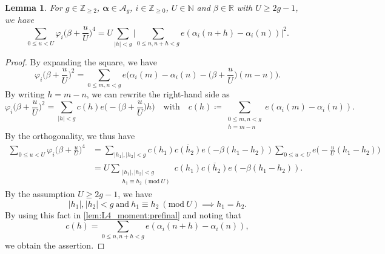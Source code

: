 \documentclass[hidelinks]{amsart}
\numberwithin{equation}{section}
\theoremstyle{plain}
\newtheorem{lemma}{Lemma}
\theoremstyle{definition}
\let\tmp\phi
\let\phi\varphi
\let\varphi\tmp
\let\tmp\epsilon
\let\epsilon\varepsilon
\let\varepsilon\tmp
\renewcommand{\mod}[1]{(\mathrm{mod}\ #1)}
\begin{document}
\begin{lemma}
\label{lem:L4_moment}
For $g\in\mathbb{Z}_{\ge2}$, $\bm{\alpha}\in\mathscr{A}_{g}$,
$i\in\mathbb{Z}_{\ge0}$, $U\in\mathbb{N}$ and $\beta\in\mathbb{R}$ with $U\ge 2g-1$, we have
\[
\sum_{0\le u<U}
\phi_{i}\biggl(\beta+\frac{u}{U}\biggr)^{4}
=
U\sum_{|h|<g}
\biggl|
\sum_{0\le n,n+h<g}e(\alpha_{i}(n+h)-\alpha_{i}(n))
\biggr|^{2}.
\]
\end{lemma}
\begin{proof}
By expanding the square, we have
\[
\phi_{i}\biggl(\beta+\frac{u}{U}\biggr)^{2}
=
\sum_{0\le m,n<g}
e\biggl(\alpha_{i}(m)-\alpha_{i}(n)-\biggl(\beta+\frac{u}{U}\biggr)(m-n)\biggr).
\]
By writing $h=m-n$, we can rewrite the right-hand side as
\[
\phi_{i}\biggl(\beta+\frac{u}{U}\biggr)^{2}
=
\sum_{|h|<g}
c(h)
e\biggl(-\biggl(\beta+\frac{u}{U}\biggr)h\biggr)
\quad\text{with}\quad
c(h)
\coloneqq
\sum_{\substack{
0\le m,n<g\\
h=m-n
}}
e(\alpha_{i}(m)-\alpha_{i}(n)).
\]
By the orthogonality, we thus have
\begin{equation}
\label{lem:L4_moment:prefinal}
\begin{aligned}
\sum_{0\le u<U}
\phi_{i}\biggl(\beta+\frac{u}{U}\biggr)^{4}
&=
\sum_{|h_{1}|,|h_{2}|<g}
c(h_{1})\overline{c(h_{2})}
e(-\beta(h_{1}-h_{2}))
\sum_{0\le u<U}
e\biggl(-\frac{u}{U}(h_{1}-h_{2})\biggr)\\
&=
U\sum_{\substack{
|h_{1}|,|h_{2}|<g\\
h_{1}\equiv h_{2}\ \mod{U}
}}
c(h_{1})\overline{c(h_{2})}
e(-\beta(h_{1}-h_{2})).
\end{aligned}
\end{equation}
By the assumption $U\ge 2g-1$, we have
\[
|h_{1}|,|h_{2}|<g\ \text{and}\ 
h_{1}\equiv h_{2}\ \mod{U}
\implies
h_{1}=h_{2}.
\]
By using this fact in \cref{lem:L4_moment:prefinal} and noting that
\[
c(h)
=
\sum_{0\le n,n+h<g}
e(\alpha_{i}(n+h)-\alpha_{i}(n)),
\]
we obtain the assertion.
\end{proof}
\end{document}
